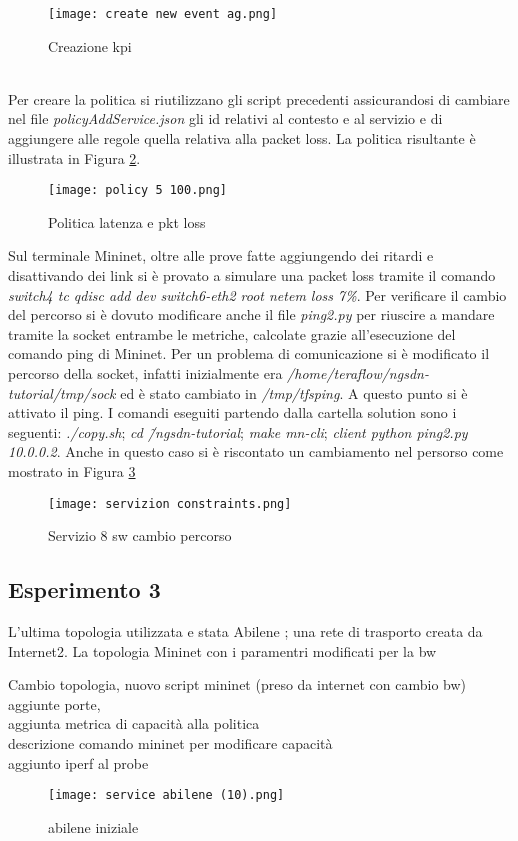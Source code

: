 \begin{figure}[h]
    \centering
   \texttt{[image: create new event ag.png]}
    \caption{Creazione kpi}
    \label{fig:ag}
\end{figure}
\\Per creare la politica si riutilizzano gli script precedenti assicurandosi di cambiare nel file \textit{policyAddService.json}
gli id relativi al contesto e al servizio e di aggiungere alle regole quella relativa alla packet loss.
La politica risultante è illustrata in Figura \ref{fig:policy}.
\begin{figure}[h]
    \centering
   \texttt{[image: policy 5 100.png]}
    \caption{Politica latenza e pkt loss}
    \label{fig:policy}
\end{figure}
Sul terminale Mininet, oltre alle prove fatte aggiungendo dei ritardi e disattivando dei link si è provato a simulare una packet loss tramite il comando
\textit{switch4 tc qdisc add dev switch6-eth2 root netem loss 7\%}.
Per verificare il cambio del percorso si è dovuto modificare anche il file \textit{ping2.py} per riuscire a mandare tramite la socket
entrambe le metriche, calcolate grazie all'esecuzione del comando ping di Mininet. 
Per un problema di comunicazione si è modificato il percorso della socket, infatti inizialmente era \textit{/home/teraflow/ngsdn-tutorial/tmp/sock} ed
è stato cambiato in \textit{/tmp/tfsping}.
A questo punto si è attivato il ping.
I comandi eseguiti partendo dalla cartella solution sono i seguenti: \textit{./copy.sh};
\textit{cd \~/ngsdn-tutorial}; \textit{make mn-cli}; \textit{client python ping2.py 10.0.0.2}.
Anche in questo caso si è riscontato un cambiamento nel persorso come mostrato in Figura \ref{fig:sw8 dopo}
\begin{figure}[h]
    \centering
   \texttt{[image: servizion constraints.png]}
    \caption{Servizio 8 sw cambio percorso}
    \label{fig:sw8 dopo}
\end{figure}

\subsection{Esperimento 3}
L'ultima topologia utilizzata e stata Abilene \cite{abilene}; una rete di trasporto creata da Internet2.
La topologia Mininet \cite{topab} con i paramentri modificati per la bw

Cambio topologia, nuovo script mininet (preso da internet con cambio bw)
\\ aggiunte porte,
\\aggiunta metrica di capacità alla politica
\\descrizione comando mininet per modificare capacità
\\aggiunto iperf al probe
\begin{figure}[h]
    \centering
   \texttt{[image: service abilene (10).png]}
    \caption{abilene iniziale}
    \label{fig:abilene}
\end{figure}

